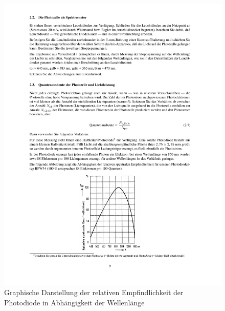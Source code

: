 \documentclass[12px]{scrartcl}
\begin{document}
\begin{figure}[htbp] 
  \centering
    \includegraphics[trim = 35mm 33mm 1mm 170mm, clip, scale = 1]{abb_rel.pdf}
  	\caption[Graphische Darstellung der relativen Empfindlichkeit der Photodiode in Abhängigkeit der Wellenlänge]{Graphische Darstellung der relativen Empfindlichkeit der Photodiode in Abhängigkeit der Wellenlänge\footnotemark}
  \label{fig:schaltskizze}
\end{figure}
\end{document}
